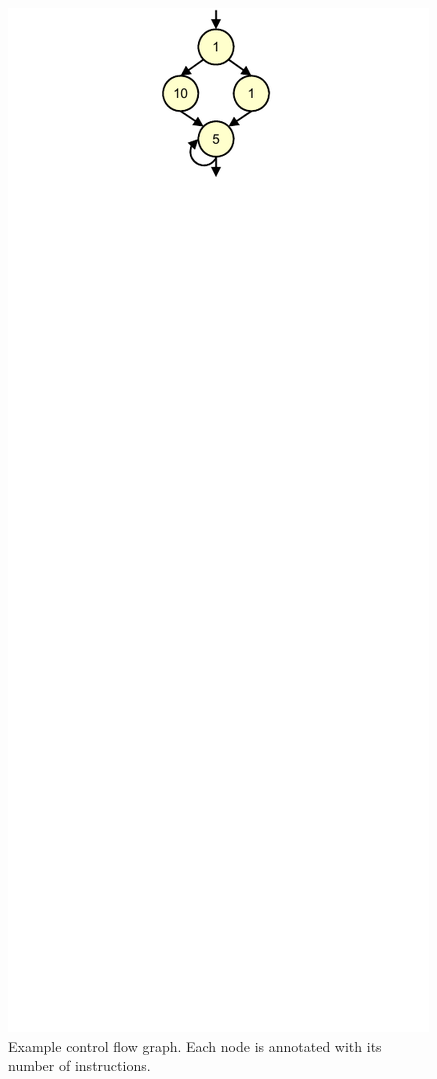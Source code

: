 \begin{figure}
  \begin{center}
    \includegraphics{exec_time_prediction/figs/cfg.pdf}
    \caption{Example control flow graph. Each node is annotated with its number of instructions.}
    \label{fig:prediction.cfg}
  \end{center}
\end{figure}

